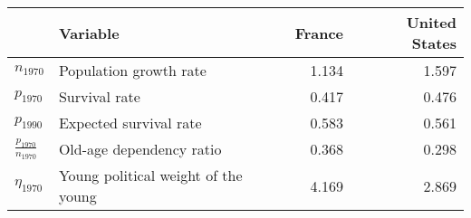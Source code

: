 
\begin{tabular}{llrr}
\toprule
\textbf{} & \textbf{Variable} & \textbf{France} & \textbf{United States}\\
\midrule
$n_{1970}$ & Population growth rate & 1.134 & 1.597\\
$p_{1970}$ & Survival rate & 0.417 & 0.476\\
$p_{1990}$ & Expected survival rate & 0.583 & 0.561\\
$\frac{p_{1970}}{n_{1970}}$ & Old-age dependency ratio & 0.368 & 0.298\\
$\eta_{1970}$ & Young political weight of the young & 4.169 & 2.869\\
\bottomrule
\end{tabular}

